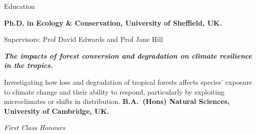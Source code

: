 \begin{rubric}{Education}

\entry*[2014 -- 2018]%
	\textbf{Ph.D. in Ecology \& Conservation, University of Sheffield, UK.}
	\par Supervisors: Prof David Edwards and Prof Jane Hill
	\par \textbf{\emph{The impacts of forest conversion and degradation on climate resilience in the tropics.}}
	\par Investigating how loss and degradation of tropical forests affects species' exposure to climate change and their ability to respond, particularly by exploiting microclimates or shifts in distribution.
%
\entry*[2010 -- 2013]%
	\textbf{B.A.~(Hons) Natural Sciences, University of Cambridge, UK.}\par
	\emph{First Class Honours}
%
\end{rubric}